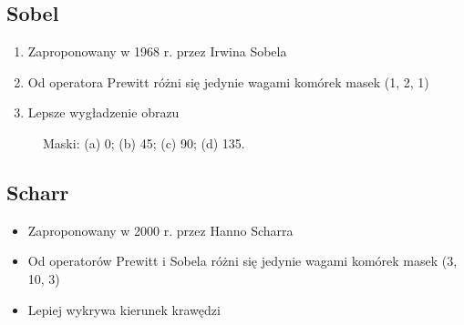 \documentclass[a4paper,twocolumn,12pt]{article}
\begin{document}
\subsection{Sobel}

\begin{enumerate}
 \item Zaproponowany w 1968 r. przez Irwina Sobela
 \item Od operatora Prewitt różni się jedynie wagami komórek masek (1, 2, 1)
 \item Lepsze wygładzenie obrazu
\end{enumerate}

\begin{figure}[!ht]
 \begin{center}
 \end{center}
 \caption{
  Maski:
  (a) 0\textdegree;
  (b) 45\textdegree;
  (c) 90\textdegree;
  (d) 135\textdegree.
 }
 \label{fig:sobel_matrices}
\end{figure}


\subsection{Scharr}

\begin{itemize}
 \item Zaproponowany w 2000 r. przez Hanno Scharra
 \item Od operatorów Prewitt i Sobela różni się jedynie wagami komórek masek (3, 10, 3)
 \item Lepiej wykrywa kierunek krawędzi
\end{itemize}
\end{document}
